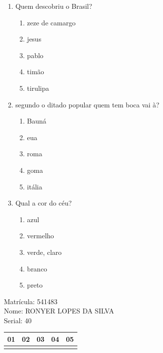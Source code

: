 \documentclass[10pt,a4paper,twocolumn]{report}
\begin{document}
 \begin{enumerate} 
    \item  Quem descobriu o Brasil?





    \begin{enumerate}
    \item  zeze de camargo

\item  jesus

\item  pablo

\item  timão

\item  tirulipa


    \end{enumerate} 
    \item  segundo o ditado popular quem tem boca vai à?





    \begin{enumerate}
    \item  Bauná

\item  eua

\item  roma

\item  goma

\item  itália


    \end{enumerate} 
    \item  Qual a cor do céu?





    \begin{enumerate}
    \item  azul

\item  vermelho

\item  verde, claro

\item  branco

\item  preto


    \end{enumerate}\end{enumerate} 
Matrícula: 541483\\ Nome: RONYER LOPES DA SILVA \\ Serial: 40\\
\begin{tabular}{|l|l|l|l|l|}\hline
01  &02  &03  &04  &05 \\ \hline 
 & & & & \\ \hline 
\end{tabular}
 \cleardoublepage 
\end{document}
